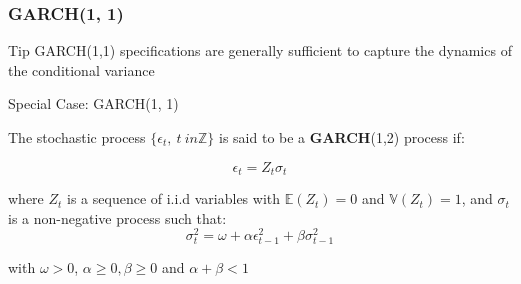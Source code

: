 \documentclass{beamer}
\begin{document}
\begin{frame}
  \frametitle{GARCH(1, 1)}

  \begin{alertblock}{Tip}
GARCH(1,1) specifications are generally sufficient to capture the dynamics of the conditional variance
  \end{alertblock}

  \medskip
  
\begin{block}{Special Case: GARCH(1, 1)}

  The stochastic process $\{ \epsilon_t, \ t \ in \mathbb{Z} \}$ is said to be a \textbf{GARCH}(1,2) process if:

  \begin{equation*}
    \epsilon_t = Z_t \sigma_t
  \end{equation*}

  \medskip

  where $Z_t$ is a sequence of i.i.d variables with $\mathbb{E}(Z_t) = 0$ and $\mathbb{V}(Z_t) = 1$, and $\sigma_t$ is a non-negative process such that:
  \begin{equation*}
    \sigma^2_t = \omega + \alpha \epsilon^2_{t-1} + \beta \sigma^2_{t-1}
  \end{equation*}

  \medskip

  with $\omega >0$, $\alpha \geq 0, \beta \geq 0$ and $\alpha + \beta <1$  
\end{block}
\end{frame}
\end{document}
